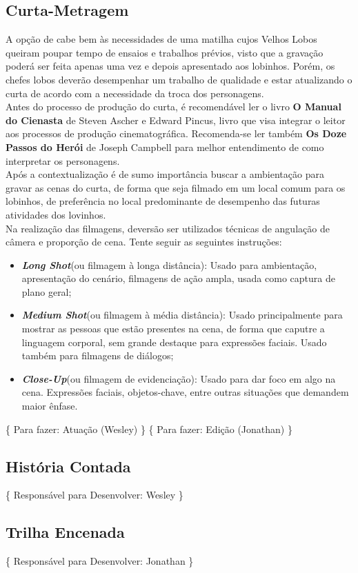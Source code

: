 		\subsection[Curta-Metragem]{Curta-Metragem}
		\label{subsec:sugestoes_encenacao_curtaMetragem}
			A opção de  cabe bem às necessidades de uma matilha cujos Velhos Lobos queiram poupar tempo de ensaios e trabalhos prévios, visto que a gravação poderá ser feita apenas uma vez e depois apresentado aos lobinhos. Porém, os chefes lobos deverão desempenhar um trabalho de qualidade e estar atualizando o curta de acordo com a necessidade da troca dos personagens.
			\\ \indent Antes do processo de produção do curta, é recomendável ler o livro \textbf{O Manual do Cienasta} de Steven Ascher e Edward Pincus, livro que visa integrar o leitor aos processos de produção cinematográfica. Recomenda-se ler também \textbf{Os Doze Passos do Herói} de Joseph Campbell para melhor entendimento de como interpretar os personagens.
			\\ \indent Após a contextualização é de sumo importância buscar a ambientação para gravar as cenas do curta, de forma que seja filmado em um local comum para os lobinhos, de preferência no local predominante de desempenho das futuras atividades dos lovinhos.
			\\ \indent Na realização das filmagens, deversão ser utilizados técnicas de angulação de câmera e proporção de cena. Tente seguir as seguintes instruções:
			\begin{itemize}
				\item{\emph{\textbf{Long Shot}}(ou filmagem à longa distância): Usado para ambientação, apresentação do cenário, filmagens de ação ampla, usada como captura de plano geral;}
				\item{\emph{\textbf{Medium Shot}}(ou filmagem à média distância): Usado principalmente para mostrar as pessoas que estão presentes na cena, de forma que caputre a linguagem corporal, sem grande destaque para expressões faciais. Usado também para filmagens de diálogos;}
				\item{\emph{\textbf{Close-Up}}(ou filmagem de evidenciação): Usado para dar foco em algo na cena. Expressões faciais, objetos-chave, entre outras situações que demandem maior ênfase.}
			\end{itemize}
			\{ Para fazer: Atuação (Wesley) \}
			\{ Para fazer: Edição (Jonathan) \}

		\subsection[História Contada]{História Contada}
		\label{subsec:sugestoes_encenacao_historiaContada}
			\{ Responsável para Desenvolver: Wesley \}

		\subsection[Trilha Encenada]{Trilha Encenada}
		\label{subsec:sugestoes_encenacao_trilhaEncenada}
			\{ Responsável para Desenvolver: Jonathan \}
